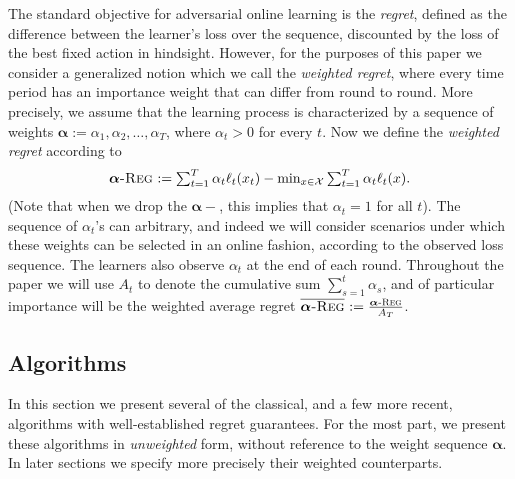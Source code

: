 \documentclass[pmlr]{jmlr} %
\def\balpha{\boldsymbol{\alpha}}
\newcommand{\regret}[1]{\balpha\textsc{-Reg}^{#1}}
\newcommand{\avgregret}[1]{\overline{\balpha\textsc{-Reg}}^{#1}}
\newcommand{\XX}{\mathcal{X}}
\begin{document}
The standard objective for adversarial online learning is the \emph{regret}, defined as the difference between the learner's loss over the sequence, discounted by the loss of the best fixed action in hindsight. However, for the purposes of this paper we consider a generalized notion which we call the \emph{weighted regret}, where every time period has an importance weight that can differ from round to round. More precisely, we assume that the learning process is characterized by a sequence of weights $\balpha := \alpha_{1}, \alpha_{2}, \ldots, \alpha_{T}$, where $\alpha_{t} > 0$ for every $t$. Now we define the \emph{weighted regret} according to
\[
\textstyle  \regret{} := \sum_{t=1}^{T}  \alpha_{t}  \ell_{t}(x_{t}) - \min_{x \in \XX} \sum_{t=1}^{T}  \alpha_{t}  \ell_{t}(x).
\]
(Note that when we drop the $\balpha-$, this implies that $\alpha_{t} = 1$ for all $t$). The sequence of $\alpha_{t}$'s can arbitrary, and indeed we will consider scenarios under which these weights can be selected in an online fashion, according to the observed loss sequence. The learners also observe $\alpha_{t}$ at the end of each round. Throughout the paper we will use $A_{t}$ to denote the cumulative sum $\sum_{s=1}^{t} \alpha_{s}$, and of particular importance will be the weighted average regret $\avgregret{} := \frac{\regret{}}{A_{T}}$.


\subsection{Algorithms}
In this section we present several of the classical, and a few more recent, algorithms with well-established regret guarantees. For the most part, we present these algorithms in \emph{unweighted} form, without reference to the weight sequence $\balpha$. In later sections we specify more precisely their weighted counterparts.
\end{document}
